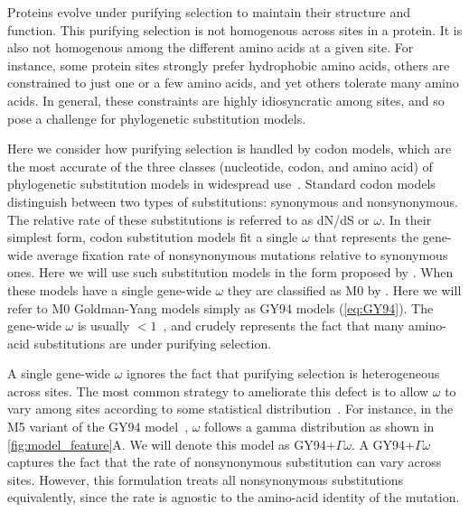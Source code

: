 \documentclass[11pt]{article}
\begin{document}
Proteins evolve under purifying selection to maintain their structure and function. 
This purifying selection is not homogenous across sites in a protein.
It is also not homogenous among the different amino acids at a given site.
For instance, some protein sites strongly prefer hydrophobic amino acids, others are constrained to just one or a few amino acids, and yet others tolerate many amino acids.
In general, these constraints are highly idiosyncratic among sites, and so pose a challenge for phylogenetic substitution models.

Here we consider how purifying selection is handled by codon models, which are the most accurate of the three classes (nucleotide, codon, and amino acid) of phylogenetic substitution models in widespread use~\citep{arenas2015trends}.
Standard codon models distinguish between two types of substitutions: synonymous and nonsynonymous.
The relative rate of these substitutions is referred to as dN/dS or $\omega$.
In their simplest form, codon substitution models fit a single $\omega$ that represents the gene-wide average fixation rate of nonsynonymous mutations relative to synonymous ones.
Here we will use such substitution models in the form proposed by \citet{goldman1994codon}.
When these models have a single gene-wide $\omega$ they are classified as M0 by \citet{yang2000codon}.
Here we will refer to M0 Goldman-Yang models simply as GY94 models (\ref{eq:GY94}). 
The gene-wide $\omega$ is usually $<1$~\citep{murrell2015gene}, and crudely represents the fact that many amino-acid substitutions are under purifying selection.

A single gene-wide $\omega$ ignores the fact that purifying selection is heterogeneous across sites.
The most common strategy to ameliorate this defect is to allow $\omega$ to vary among sites according to some statistical distribution~\citep{yang1994maximum,yang2000codon}.
For instance, in the M5 variant of the GY94 model~\citep{yang2000codon}, $\omega$ follows a gamma distribution as shown in \ref{fig:model_feature}A.
We will denote this model as GY94+$\Gamma\omega$.
A GY94+$\Gamma\omega$ captures the fact that the rate of nonsynonymous substitution can vary across sites. 
However, this formulation treats all nonsynonymous substitutions equivalently, since the rate is agnostic to the amino-acid identity of the mutation. 
\end{document}
